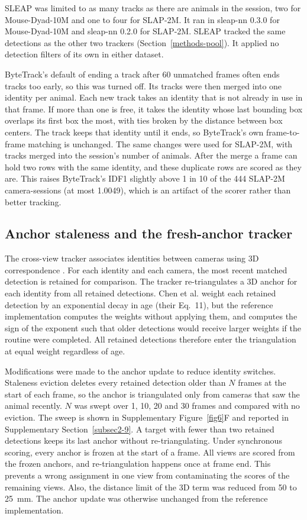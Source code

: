 \documentclass[pdflatex, sn-nature]{sn-jnl}
\theoremstyle{thmstyleone}%
\theoremstyle{thmstyletwo}%
\theoremstyle{thmstylethree}%
\begin{document}
SLEAP was limited to as many tracks as there are animals in the session, two for Mouse-Dyad-10M and one to four for SLAP-2M. It ran in sleap-nn 0.3.0 for Mouse-Dyad-10M and sleap-nn 0.2.0 for SLAP-2M. SLEAP tracked the same detections as the other two trackers (Section~\ref{methods-pool}). It applied no detection filters of its own in either dataset.

ByteTrack's default of ending a track after 60 unmatched frames often ends tracks too early, so this was turned off. Its tracks were then merged into one identity per animal. Each new track takes an identity that is not already in use in that frame. If more than one is free, it takes the identity whose last bounding box overlaps its first box the most, with ties broken by the distance between box centers. The track keeps that identity until it ends, so ByteTrack's own frame-to-frame matching is unchanged. The same changes were used for SLAP-2M, with tracks merged into the session's number of animals. After the merge a frame can hold two rows with the same identity, and these duplicate rows are scored as they are. This raises ByteTrack's IDF1 slightly above 1 in 10 of the 444 SLAP-2M camera-sessions (at most 1.0049), which is an artifact of the scorer rather than better tracking.

\subsection{Anchor staleness and the fresh-anchor tracker}\label{methods-anchor}

The cross-view tracker associates identities between cameras using 3D correspondence \citep{Chen2020}. For each identity and each camera, the most recent matched detection is retained for comparison. The tracker re-triangulates a 3D anchor for each identity from all retained detections. Chen et al. \citep{Chen2020} weight each retained detection by an exponential decay in age (their Eq.~11), but the reference implementation computes the weights without applying them, and computes the sign of the exponent such that older detections would receive larger weights if the routine were completed. All retained detections therefore enter the triangulation at equal weight regardless of age.

Modifications were made to the anchor update to reduce identity switches. Staleness eviction deletes every retained detection older than $N$ frames at the start of each frame, so the anchor is triangulated only from cameras that saw the animal recently. $N$ was swept over 1, 10, 20 and 30 frames and compared with no eviction. The sweep is shown in Supplementary Figure~\ref{fig6}F and reported in Supplementary Section~\ref{subsec2-9}. A target with fewer than two retained detections keeps its last anchor without re-triangulating. Under synchronous scoring, every anchor is frozen at the start of a frame. All views are scored from the frozen anchors, and re-triangulation happens once at frame end. This prevents a wrong assignment in one view from contaminating the scores of the remaining views. Also, the distance limit of the 3D term was reduced from 50 to 25~mm. The anchor update was otherwise unchanged from the reference implementation.
\end{document}

